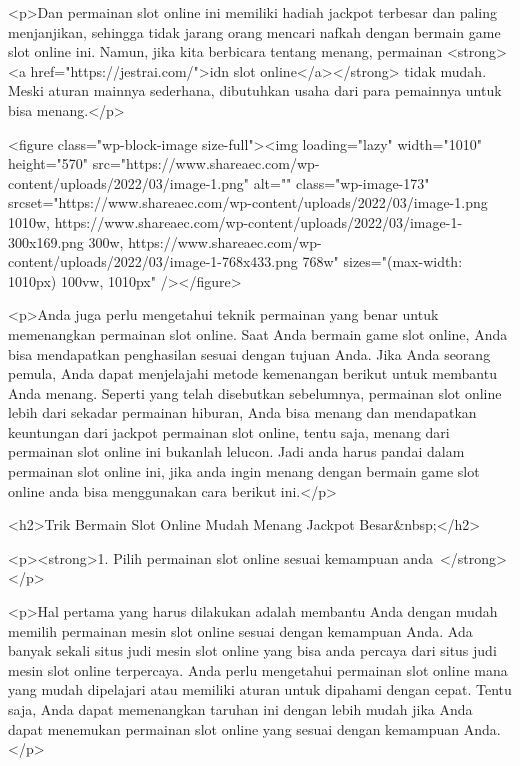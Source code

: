{<p>Dan permainan slot online ini memiliki hadiah jackpot terbesar dan paling menjanjikan, sehingga tidak jarang orang mencari nafkah dengan bermain game slot online ini. Namun, jika kita berbicara tentang menang, permainan <strong><a href="https://jestrai.com/">idn slot online</a></strong> tidak mudah. Meski aturan mainnya sederhana, dibutuhkan usaha dari para pemainnya untuk bisa menang.</p>



<figure class="wp-block-image size-full"><img loading="lazy" width="1010" height="570" src="https://www.shareaec.com/wp-content/uploads/2022/03/image-1.png" alt="" class="wp-image-173" srcset="https://www.shareaec.com/wp-content/uploads/2022/03/image-1.png 1010w, https://www.shareaec.com/wp-content/uploads/2022/03/image-1-300x169.png 300w, https://www.shareaec.com/wp-content/uploads/2022/03/image-1-768x433.png 768w" sizes="(max-width: 1010px) 100vw, 1010px" /></figure>



<p>Anda juga perlu mengetahui teknik permainan yang benar untuk memenangkan permainan slot online. Saat Anda bermain game slot online, Anda bisa mendapatkan penghasilan sesuai dengan tujuan Anda. Jika Anda seorang pemula, Anda dapat menjelajahi metode kemenangan berikut untuk membantu Anda menang. Seperti yang telah disebutkan sebelumnya, permainan slot online lebih dari sekadar permainan hiburan, Anda bisa menang dan mendapatkan keuntungan dari jackpot permainan slot online, tentu saja, menang dari permainan slot online ini bukanlah lelucon. Jadi anda harus pandai dalam permainan slot online ini, jika anda ingin menang dengan bermain game slot online anda bisa menggunakan cara berikut ini.</p>



<h2>Trik Bermain Slot Online Mudah Menang Jackpot Besar&nbsp;</h2>



<p><strong>1. Pilih permainan slot online sesuai kemampuan anda </strong></p>



<p>Hal pertama yang harus dilakukan adalah membantu Anda dengan mudah memilih permainan mesin slot online sesuai dengan kemampuan Anda. Ada banyak sekali situs judi mesin slot online yang bisa anda percaya dari situs judi mesin slot online terpercaya. Anda perlu mengetahui permainan slot online mana yang mudah dipelajari atau memiliki aturan untuk dipahami dengan cepat. Tentu saja, Anda dapat memenangkan taruhan ini dengan lebih mudah jika Anda dapat menemukan permainan slot online yang sesuai dengan kemampuan Anda.</p>



}
